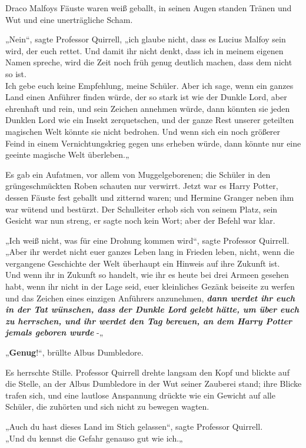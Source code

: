 {Draco Malfoys Fäuste waren weiß geballt, in seinen Augen standen Tränen und Wut und eine unerträgliche Scham.

„Nein“, sagte Professor Quirrell, „ich glaube nicht, dass es Lucius Malfoy sein wird, der euch rettet. Und damit ihr nicht denkt, dass ich in meinem eigenen Namen spreche, wird die Zeit noch früh genug deutlich machen, dass dem nicht so ist.\\ Ich gebe euch keine Empfehlung, meine Schüler. Aber ich sage, wenn ein ganzes Land einen Anführer finden würde, der so stark ist wie der Dunkle Lord, aber ehrenhaft und rein, und sein Zeichen annehmen würde, dann könnten sie jeden Dunklen Lord wie ein Insekt zerquetschen, und der ganze Rest unserer geteilten magischen Welt könnte sie nicht bedrohen. Und wenn sich ein noch größerer Feind in einem Vernichtungskrieg gegen uns erheben würde, dann könnte nur eine geeinte magische Welt überleben.„

Es gab ein Aufatmen, vor allem von Muggelgeborenen; die Schüler in den grüngeschmückten Roben schauten nur verwirrt. Jetzt war es Harry Potter, dessen Fäuste fest geballt und zitternd waren; und Hermine Granger neben ihm war wütend und bestürzt. Der Schulleiter erhob sich von seinem Platz, sein Gesicht war nun streng, er sagte noch kein Wort; aber der Befehl war klar.

„Ich weiß nicht, was für eine Drohung kommen wird“, sagte Professor Quirrell.\\ „Aber ihr werdet nicht euer ganzes Leben lang in Frieden leben, nicht, wenn die vergangene Geschichte der Welt überhaupt ein Hinweis auf ihre Zukunft ist.\\ Und wenn ihr in Zukunft so handelt, wie ihr es heute bei drei Armeen gesehen habt, wenn ihr nicht in der Lage seid, euer kleinliches Gezänk beiseite zu werfen und das Zeichen eines einzigen Anführers anzunehmen, \textbf{\emph{dann werdet ihr euch in der Tat wünschen, dass der Dunkle Lord gelebt hätte, um über euch zu herrschen, und ihr werdet den Tag bereuen, an dem Harry Potter jemals geboren wurde}} -„

„\textbf{Genug}!“, brüllte Albus Dumbledore.

Es herrschte Stille. Professor Quirrell drehte langsam den Kopf und blickte auf die Stelle, an der Albus Dumbledore in der Wut seiner Zauberei stand; ihre Blicke trafen sich, und eine lautlose Anspannung drückte wie ein Gewicht auf alle Schüler, die zuhörten und sich nicht zu bewegen wagten.

„Auch du hast dieses Land im Stich gelassen“, sagte Professor Quirrell.\\ „Und du kennst die Gefahr genauso gut wie ich.„

}
